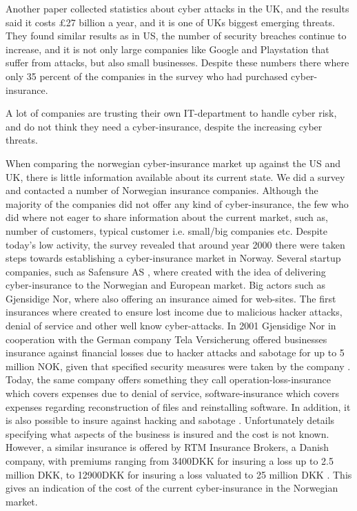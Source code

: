 Another paper \cite{evolvingcyber} collected statistics about cyber attacks in the UK, and the results said it costs \pounds 27
 billion a year, and it is one of UKs biggest emerging threats. They found similar results as in US,
  the number of security breaches continue to increase, and it is not only large companies like Google
   and Playstation that suffer from attacks, but also small businesses. Despite these numbers
    there where only 35 percent of the companies in the survey who had purchased cyber-insurance. 

A lot of companies are trusting their own IT-department to handle cyber risk, 
and do not think they need a cyber-insurance, despite the increasing cyber threats. \cite{twatson}


When comparing the norwegian cyber-insurance market up against the US and UK, 
there is little information available about its current state. We did a survey and contacted a number of Norwegian insurance companies. Although the majority of the companies did not offer any kind of cyber-insurance, the few who did where not eager to share information about the current market, such as, number of customers, typical customer i.e. small/big companies etc.  
Despite today's low activity, the survey revealed that around year 2000 there were taken steps towards
 establishing a cyber-insurance market in Norway. Several startup companies, such as Safensure AS \cite{digi},
  where created with the idea of delivering cyber-insurance to the Norwegian and European market. Big actors such as Gjensidige Nor, where also offering an insurance aimed for web-sites. 
The first insurances where created to ensure lost income due to malicious hacker attacks, denial of service and other well know cyber-attacks. 
In 2001 Gjensidige Nor in cooperation with the German company Tela Versicherung offered businesses
 insurance against financial losses due to hacker attacks and sabotage for up to 5 million NOK, given that specified security measures were taken by the company \cite{dagensithackerforsikring}. 
 Today, the same company 
offers something they call operation-loss-insurance which covers expenses due to denial of service,
 software-insurance which covers expenses regarding reconstruction of files and reinstalling software.
 In addition, it is also possible to insure against hacking and sabotage \citep{gjensidige}. 
 Unfortunately details specifying what aspects of the business is insured and the cost is not known. However,
  a similar insurance is offered by RTM Insurance Brokers, a Danish company, with premiums ranging from 3400DKK for insuring a loss up to 2.5 million DKK, to 12900DKK for insuring a loss valuated to 25 million DKK \cite{RTM}. This gives an indication of the cost of the current cyber-insurance in the Norwegian market. 


